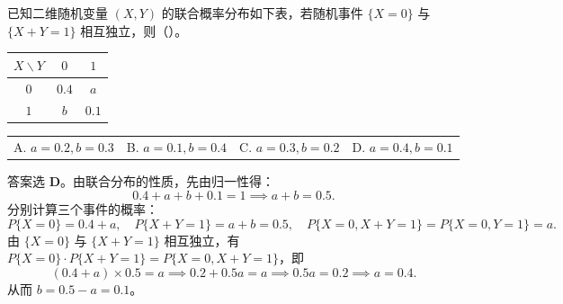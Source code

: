 ﻿\documentclass[lang=cn,11pt]{elegantbook}
\begin{document}
\begin{exercise}\label{exer:3-3}
已知二维随机变量 $(X,Y)$ 的联合概率分布如下表，若随机事件 $\{X=0\}$ 与 $\{X+Y=1\}$ 相互独立，则（\quad）。
\begin{center}
\begin{tabular}{c|cc}
\toprule
$X \backslash Y$ & $0$ & $1$ \\
\midrule
$0$ & $0.4$ & $a$ \\
$1$ & $b$ & $0.1$ \\
\bottomrule
\end{tabular}
\end{center}
\begin{tabular}{llll}
A. $a=0.2, b=0.3$ & B. $a=0.1, b=0.4$ & C. $a=0.3, b=0.2$ & D. $a=0.4, b=0.1$
\end{tabular}
\end{exercise}
\begin{solution}
答案选 \textbf{D}。由联合分布的性质，先由归一性得：
\[
0.4 + a + b + 0.1 = 1 \implies a + b = 0.5.
\]
分别计算三个事件的概率：
\[
P\{X=0\} = 0.4 + a, \quad P\{X+Y=1\} = a + b = 0.5, \quad P\{X=0, X+Y=1\} = P\{X=0, Y=1\} = a.
\]
由 $\{X=0\}$ 与 $\{X+Y=1\}$ 相互独立，有 $P\{X=0\} \cdot P\{X+Y=1\} = P\{X=0, X+Y=1\}$，即
\[
(0.4 + a) \times 0.5 = a \implies 0.2 + 0.5a = a \implies 0.5a = 0.2 \implies a = 0.4.
\]
从而 $b = 0.5 - a = 0.1$。
\end{solution}
\end{document}
